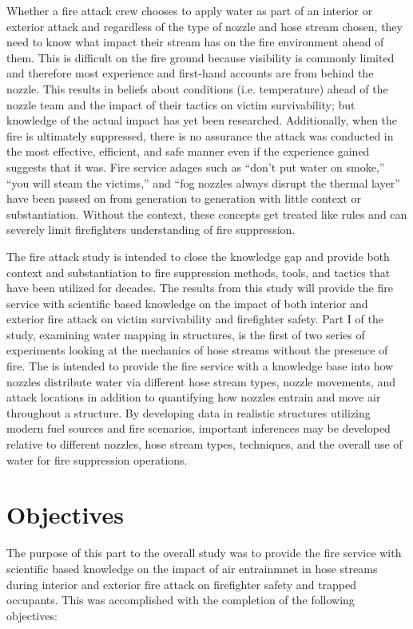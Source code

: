 \documentclass[12pt,oneside]{book}
\begin{document}
Whether a fire attack crew chooses to apply water as part of an interior or exterior attack and regardless of the type of nozzle and hose stream chosen, they need to know what impact their stream has on the fire environment ahead of them. This is difficult on the fire ground because visibility is commonly limited and therefore most experience and first-hand accounts are from behind the nozzle. This results in beliefs about conditions (i.e. temperature) ahead of the nozzle team and the impact of their tactics on victim survivability; but knowledge of the actual impact has yet been researched. Additionally, when the fire is ultimately suppressed, there is no assurance the attack was conducted in the most effective, efficient, and safe manner even if the experience gained suggests that it was. Fire service adages such as ``don't put water on smoke,'' ``you will steam the victims,'' and ``fog nozzles always disrupt the thermal layer'' have been passed on from generation to generation with little context or substantiation. Without the context, these concepts get treated like rules and can severely limit firefighters understanding of fire suppression.

The fire attack study is intended to close the knowledge gap and provide both context and substantiation to fire suppression methods, tools, and tactics that have been utilized for decades. The results from this study will provide the fire service with scientific based knowledge on the impact of both interior and exterior fire attack on victim survivability and firefighter safety. Part I of the study, examining water mapping in structures, is the first of two series of experiments looking at the mechanics of hose streams without the presence of fire. The is intended to provide the fire service with a knowledge base into how nozzles distribute water via different hose stream types, nozzle movements, and attack locations in addition to quantifying how nozzles entrain and move air throughout a structure. By developing data in realistic structures utilizing modern fuel sources and fire scenarios, important inferences may be developed relative to different nozzles, hose stream types, techniques, and the overall use of water for fire suppression operations.

\clearpage

\chapter{Objectives}

The purpose of this part to the overall study was to provide the fire service with scientific based knowledge on the impact of air entrainmnet in hose streams during interior and exterior fire attack on firefighter safety and trapped occupants. This was accomplished with the completion of the following objectives:
\end{document}
